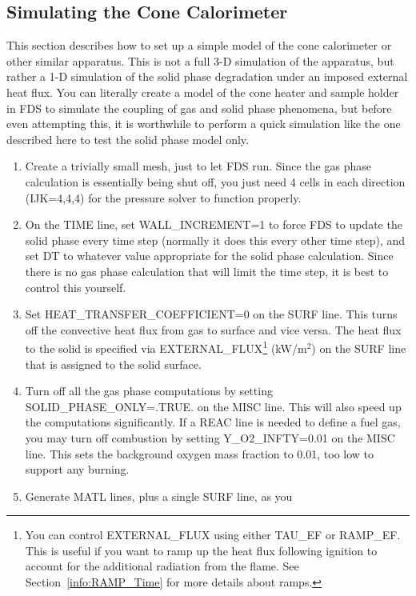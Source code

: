 \documentclass[11pt]{book}
\begin{document}
\subsection{Simulating the Cone Calorimeter}

This section describes how to set up a simple model of the cone calorimeter or other similar apparatus. This is not a full 3-D simulation of the apparatus, but rather a 1-D simulation of the solid phase degradation under an imposed external heat flux. You can literally create a model of the cone heater and sample holder in FDS to simulate the coupling of gas and solid phase phenomena, but before even attempting this, it is worthwhile to perform a quick simulation like the one described here to test the solid phase model only.

\begin{enumerate}
\item Create a trivially small mesh, just to let FDS run. Since the
gas phase calculation is essentially being shut off, you just need 4
cells in each direction ({\ct IJK=4,4,4}) for the pressure solver to
function properly.
\item On the {\ct TIME} line, set {\ct WALL\_INCREMENT=1} to force FDS
to update the solid phase every time step (normally it does this every
other time step), and set {\ct DT} to whatever value appropriate for
the solid phase calculation. Since there is no gas phase calculation
that will limit the time step, it is best to control this yourself.
\item Set {\ct HEAT\_TRANSFER\_COEFFICIENT=0} on the {\ct SURF} line. This turns off the
convective heat flux from gas to surface and vice versa. The heat flux
to the solid is specified via {\ct EXTERNAL\_FLUX}\footnote{You can control {\ct EXTERNAL\_FLUX} using
either {\ct TAU\_EF} or {\ct RAMP\_EF}. This is useful if you want to ramp up the heat flux following ignition to account for the additional radiation from the flame. See Section~\ref{info:RAMP_Time} for more details about ramps.} (kW/m$^2$) on the
{\ct SURF} line that is assigned to the solid surface.
\item Turn off all the gas phase computations by setting {\ct SOLID\_PHASE\_ONLY=.TRUE.}
on the {\ct MISC} line. This will also speed
up the computations significantly. If a {\ct REAC} line is needed to define a fuel gas, you may turn off combustion by setting {\ct Y\_O2\_INFTY=0.01} on the {\ct MISC} line. This sets the background oxygen mass fraction to 0.01, too low to support any burning.
\item Generate {\ct MATL} lines, plus a single {\ct SURF} line, as you

\end{enumerate}
\end{document}
